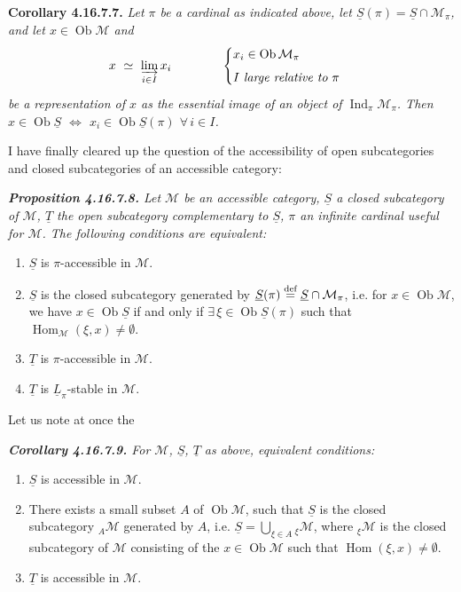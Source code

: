 \documentclass[11pt]{article}
\newcommand{\msp}[1]{\marginpar{\footnotesize [#1]}}
\newcommand{\Ob}{\operatorname{Ob}}
\newcommand{\Hom}{\operatorname{Hom}}
\newcommand{\Ind}{\operatorname{Ind}}
\newcommand{\cM}{\mathcal{M}}
\newcommand{\uS}{\underline{S}}
\newcommand{\uT}{\underline{T}}
\begin{document}
\textbf{Corollary 4.16.7.7.} \textit{Let $\pi$ be a cardinal as indicated above, let $\uS(\pi) = \uS \cap \cM_\pi$, and let $x \in \Ob \cM$ and
\[
x \ \simeq\ \varinjlim_{i\in I} x_i \qquad\qquad
\begin{cases}
x_i \in \Ob \cM_\pi \\[1ex]
I \ \textit{large relative to}\ \pi
\end{cases}
\]
be a representation of $x$ as the essential image of an object of $\Ind_\pi \cM_\pi$. Then $x \in \Ob \uS$ $\Longleftrightarrow$ $x_i \in \Ob \uS(\pi)$ $\forall\, i \in I$.}

\msp{page 487}
I have finally cleared up the question of the accessibility of open subcategories and closed subcategories of an accessible category:

\begingroup\itshape
\noindent\textbf{\upshape Proposition 4.16.7.8.} Let $\cM$ be an accessible category, $\uS$ a closed subcategory of $\cM$, $\uT$ the open subcategory complementary to $\uS$, $\pi$ an infinite cardinal useful for $\cM$. The following conditions are equivalent:
\begin{enumerate}[label={}]
\item[a)] $\uS$ is $\pi$-accessible in $\cM$.
\item[a$'$)] $\uS$ is the closed subcategory generated by $\uS(\pi) \overset{\text{\upshape def}}{=} \uS \cap \cM_\pi$, i.e. for $x \in \Ob \cM$, we have $x \in \Ob \uS$ if and only if $\exists\, \xi \in \Ob \uS(\pi)$ such that $\Hom_{\cM}(\xi, x) \neq \emptyset$.
\item[b)] $\uT$ is $\pi$-accessible in $\cM$.
\item[b$'$)] $\uT$ is $\underline{L}_\pi$-stable in $\cM$.
\end{enumerate}
\endgroup

\noindent Let us note at once the

\begingroup\itshape
\noindent\textbf{\upshape Corollary 4.16.7.9.} For $\cM$, $\uS$, $\uT$ as above, equivalent conditions:
\begin{enumerate}[label={}]
\item[a)] $\uS$ is accessible in $\cM$.
\item[a$'$)] There exists a \textup{small} subset $A$ of $\Ob \cM$, such that $\uS$ is the closed subcategory ${}_A\cM$ generated by $A$, i.e. $\uS = \bigcup_{\xi\in A} {}_\xi\cM$, where ${}_\xi\cM$ is the closed subcategory of $\cM$ consisting of the $x \in \Ob \cM$ such that $\Hom(\xi, x) \neq \emptyset$.
\item[b)] \msp{page 488}$\uT$ is accessible in $\cM$.
\end{enumerate}
\endgroup
\end{document}
